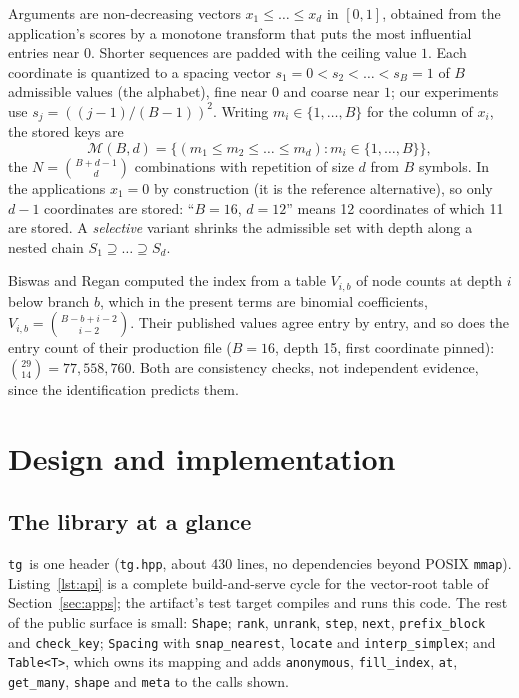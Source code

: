 \documentclass[preprint,12pt]{elsarticle}
\newcommand{\tgl}{\texttt{tg}}
\begin{document}
Arguments are non-decreasing vectors $x_1\le\dots\le x_d$ in $[0,1]$, obtained
from the application's scores by a monotone transform that puts the most
influential entries near $0$. Shorter sequences are padded with the ceiling
value $1$. Each coordinate is quantized to a spacing vector
$s_1{=}0<s_2<\dots<s_B{=}1$ of $B$ admissible values (the alphabet), fine near $0$ and coarse
near $1$; our experiments use $s_j=((j-1)/(B-1))^{2}$. Writing
$m_i\in\{1,\dots,B\}$ for the column of $x_i$, the stored keys are
\[
\mathcal{M}(B,d)=\{(m_1\le m_2\le\dots\le m_d):m_i\in\{1,\dots,B\}\},
\]
the $N=\binom{B+d-1}{d}$ combinations with repetition of size $d$ from $B$
symbols. In the applications $x_1=0$ by construction (it is the reference alternative), so only $d-1$ coordinates are stored: ``$B=16$, $d=12$'' means 12 coordinates of which 11 are stored. A
\emph{selective} variant shrinks the admissible set with depth along a nested
chain $S_1\supseteq\dots\supseteq S_d$.

Biswas and Regan computed the index from a table $V_{i,b}$ of node counts at
depth $i$ below branch $b$, which in the present terms are binomial
coefficients, $V_{i,b}=\binom{B-b+i-2}{i-2}$. Their published values agree entry by entry, and so does the entry count of their production file ($B=16$, depth 15, first
coordinate pinned): $\binom{29}{14}=77{,}558{,}760$. Both are
consistency checks, not independent evidence, since the identification
predicts them.

\section{Design and implementation}\label{sec:design}

\subsection{The library at a glance}\label{sec:api}
\tgl\ is one header (\texttt{tg.hpp}, about 430 lines, no dependencies beyond
POSIX \texttt{mmap}). Listing~\ref{lst:api} is a complete build-and-serve cycle
for the vector-root table of Section~\ref{sec:apps}; the artifact's test target
compiles and runs this code. The rest of the public surface is
small: \texttt{Shape}; \texttt{rank}, \texttt{unrank},
\texttt{step}, \texttt{next}, \texttt{prefix\_block} and \texttt{check\_key}; \texttt{Spacing} with
\texttt{snap\_nearest}, \texttt{locate} and \texttt{interp\_simplex}; and
\texttt{Table<T>}, which owns its mapping and adds
\texttt{anonymous}, \texttt{fill\_index}, \texttt{at}, \texttt{get\_many}, \texttt{shape} and \texttt{meta} to the calls shown.
\end{document}
